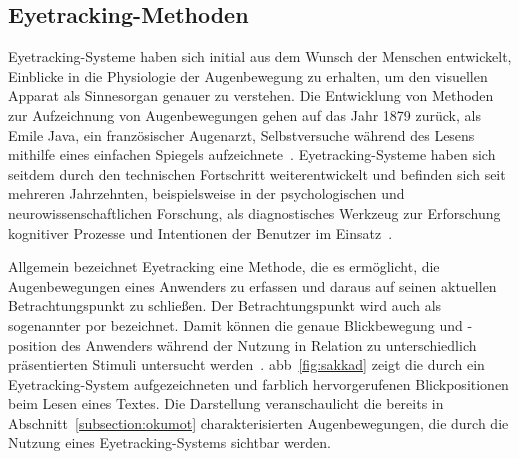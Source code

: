 \subsection{Eyetracking-Methoden}
\label{section:eyeMet}
Eyetracking-Systeme haben sich initial aus dem Wunsch der Menschen entwickelt, Einblicke in die Physiologie der Augenbewegung zu erhalten, um den visuellen Apparat als Sinnesorgan genauer zu verstehen. Die Entwicklung von Methoden zur Aufzeichnung von Augenbewegungen gehen auf das Jahr 1879 zurück, als Emile Java, ein französischer Augenarzt, Selbstversuche während des Lesens mithilfe eines einfachen Spiegels aufzeichnete~\cite{Lupu2013}. Eyetracking-Systeme haben sich seitdem durch den technischen Fortschritt weiterentwickelt und befinden sich seit mehreren Jahrzehnten, beispielsweise in der psychologischen und neurowissenschaftlichen Forschung, als diagnostisches Werkzeug zur Erforschung kognitiver Prozesse und Intentionen der Benutzer im Einsatz~\cite{Duchowski2002}.

Allgemein bezeichnet Eyetracking eine Methode, die es ermöglicht, die Augenbewegungen eines Anwenders zu erfassen und daraus auf seinen aktuellen Betrachtungspunkt zu schließen. Der Betrachtungspunkt wird auch als sogenannter \acf{por} bezeichnet. Damit können die genaue Blickbewegung und -position des Anwenders während der Nutzung in Relation zu unterschiedlich präsentierten Stimuli untersucht werden~\cite{SMI2011}. \acl{abb}~\ref{fig:sakkad} zeigt die durch ein Eyetracking-System aufgezeichneten und farblich hervorgerufenen Blickpositionen beim Lesen eines Textes. Die Darstellung veranschaulicht die bereits in Abschnitt~\ref{subsection:okumot} charakterisierten Augenbewegungen, die durch die Nutzung eines Eyetracking-Systems sichtbar werden. 
 
